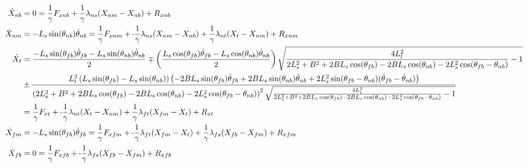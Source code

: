 \documentclass[11pt, landscape]{article}
\newcommand{\mn}{\scalebox{0.7}[1.0]{-}}
\begin{document}
\begin{align}
  \dot{X}_{nb} &= 0 = \frac{1}{\gamma}F_{xnb} + \frac{1}{\gamma}\lambda_{ns}(X_{nm} - X_{nb}) + R_{xnb} \\
  \dot{X}_{nm} &= -L_s\sin(\theta_{nb})\dot{\theta}_{nb} = \frac{1}{\gamma}F_{xnm} + \mn\frac{1}{\gamma}\lambda_{ns}(X_{nm} - X_{nb}) + \frac{1}{\gamma}\lambda_{nt}(X_{t } - X_{nm}) + R_{xnm} \\
  \dot{X}_{t}  &= \frac{-L_s\sin(\theta_{fb})\dot{\theta}_{fb} - L_s\sin(\theta_{nb})\dot{\theta}_{nb}}{2} \mp \left(\frac{L_s\cos(\theta_{fb})\dot{\theta}_{fb} - L_s\cos(\theta_{nb})\dot{\theta}_{nb}}{2}\right)\sqrt{\frac{4L_t^2}{2L_s^2 + B^2 + 2BL_s\cos(\theta_{fb}) - 2BL_s\cos(\theta_{nb}) - 2L_s^2\cos(\theta_{fb} - \theta_{nb})} -1}\\
   &\pm \frac{L_{t}^2\left(L_s\sin(\theta_{fb})-L_s\sin(\theta_{nb})\right)\left(-2BL_s\sin(\theta_{fb})\dot{\theta}_{fb} + 2BL_s\sin(\theta_{nb})\dot{\theta}_{nb} + 2L_s^2\sin(\theta_{fb} - \theta_{nb})(\dot{\theta}_{fb}-\dot{\theta}_{nb})\right)}{\left(2L_s^2 + B^2 + 2BL_s\cos(\theta_{fb}) - 2BL_s\cos(\theta_{nb}) - 2L_s^2\cos(\theta_{fb} - \theta_{nb})\right)^2\sqrt{\frac{4L_t^2}{2L_s^2 + B^2 + 2BL_s\cos(\theta_{fb}) - 2BL_s\cos(\theta_{nb}) - 2L_s^2\cos(\theta_{fb} - \theta_{nb})} -1}}\\ &= \frac{1}{\gamma}F_{xt } + \mn\frac{1}{\gamma}\lambda_{nt}(X_{t } - X_{nm}) + \frac{1}{\gamma}\lambda_{ft}(X_{fm} - X_{t }) + R_{xt } \\
  \dot{X}_{fm} &= -L_s\sin(\theta_{fb})\dot{\theta}_{fb} = \frac{1}{\gamma}F_{xfm} + \mn\frac{1}{\gamma}\lambda_{ft}(X_{fm} - X_{t }) + \frac{1}{\gamma}\lambda_{fs}(X_{fb} - X_{fm}) + R_{xfm} \\
  \dot{X}_{fb} &= 0 = \frac{1}{\gamma}F_{xfb} + \mn\frac{1}{\gamma}\lambda_{fs}(X_{fb} - X_{fm}) + R_{xfb}
\end{align}
\end{document}
